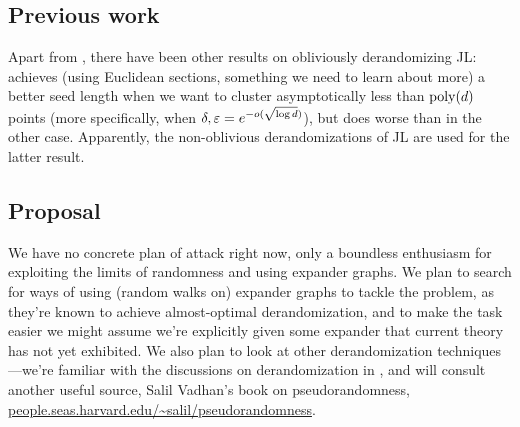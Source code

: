 
\subsection{Previous work}

Apart from \cite{kane-2011}, there have been other results on
obliviously derandomizing JL: \cite{karnin-2011} achieves (using
Euclidean sections, something we need to learn about more) a better
seed length when we want to cluster asymptotically less than
$\operatorname{poly}(d)$ points (more specifically, when
$\delta,\varepsilon=e^{-o(\sqrt{\log d})}$), but does worse than
\cite{kane-2011} in the other case. Apparently, the non-oblivious
derandomizations of JL \cite{engebretsen-2002,sivakumar-2002} are used
for the latter result.


\subsection{Proposal}

We have no concrete plan of attack right now, only a boundless
enthusiasm for exploiting the limits of randomness and using expander
graphs. We plan to search for ways of using (random walks on) expander
graphs to tackle the problem, as they're known to achieve
almost-optimal derandomization, and to make the task easier we might
assume we're explicitly given some expander that current theory has
not yet exhibited. We also plan to look at other derandomization
techniques---we're familiar with the discussions on derandomization in
\cite{motwani-2010}, and will consult another useful source, Salil
Vadhan's book on pseudorandomness,
\url{people.seas.harvard.edu/~salil/pseudorandomness}.






